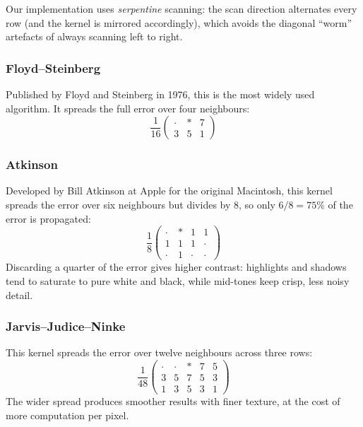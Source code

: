 \documentclass[10pt,a4paper]{article}
\begin{document}
Our implementation uses \emph{serpentine} scanning: the scan direction
alternates every row (and the kernel is mirrored accordingly), which avoids
the diagonal ``worm'' artefacts of always scanning left to right.

\subsubsection{Floyd--Steinberg}
\label{sec:fs}

Published by Floyd and Steinberg in 1976, this is the most widely used
algorithm. It spreads the full error over four neighbours:
\begin{equation}
  \frac{1}{16}
  \begin{pmatrix}
    \cdot & \ast & 7 \\
    3 & 5 & 1
  \end{pmatrix}
\end{equation}

\subsubsection{Atkinson}
\label{sec:atkinson}

Developed by Bill Atkinson at Apple for the original Macintosh, this kernel
spreads the error over six neighbours but divides by 8, so only
$6/8 = 75\%$ of the error is propagated:
\begin{equation}
  \frac{1}{8}
  \begin{pmatrix}
    \cdot & \ast & 1 & 1 \\
    1 & 1 & 1 & \cdot \\
    \cdot & 1 & \cdot & \cdot
  \end{pmatrix}
\end{equation}
Discarding a quarter of the error gives higher contrast: highlights and
shadows tend to saturate to pure white and black, while mid-tones keep
crisp, less noisy detail.

\subsubsection{Jarvis--Judice--Ninke}
\label{sec:jarvis}

This kernel spreads the error over twelve neighbours across three rows:
\begin{equation}
  \frac{1}{48}
  \begin{pmatrix}
    \cdot & \cdot & \ast & 7 & 5 \\
    3 & 5 & 7 & 5 & 3 \\
    1 & 3 & 5 & 3 & 1
  \end{pmatrix}
\end{equation}
The wider spread produces smoother results with finer texture, at the cost of
more computation per pixel.
\end{document}
